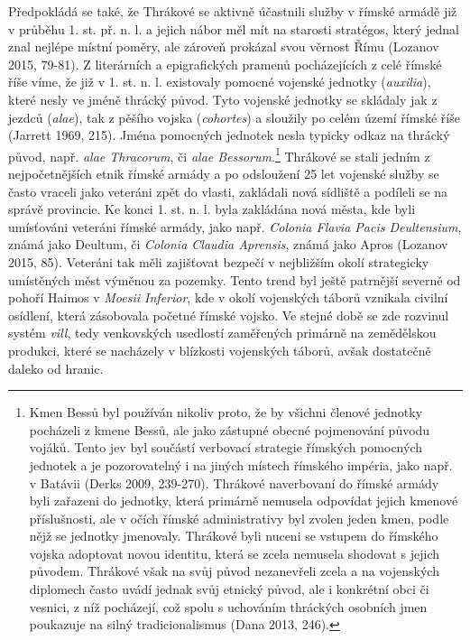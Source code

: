 Předpokládá se také, že Thrákové se aktivně účastnili služby v římské armádě již v průběhu 1. st. př. n. l. a jejich nábor měl mít na starosti stratégos, který jednal znal nejlépe místní poměry, ale zároveň prokázal svou věrnost Římu (Lozanov 2015, 79-81). Z literárních a epigrafických pramenů pocházejících z celé římské říše víme, že již v 1. st. n. l. existovaly pomocné vojenské jednotky ({\em auxilia}), které nesly ve jméně thrácký původ. Tyto vojenské jednotky se skládaly jak z jezdců ({\em alae}), tak z pěšího vojska ({\em cohortes}) a sloužily po celém území římské říše (Jarrett 1969, 215). Jména pomocných jednotek nesla typicky odkaz na thrácký původ, např. {\em alae Thracorum}, či {\em alae Bessorum}.\footnote{Kmen Bessů byl používán nikoliv proto, že by všichni členové jednotky pocházeli z kmene Bessů, ale jako zástupné obecné pojmenování původu vojáků. Tento jev byl součástí verbovací strategie římských pomocných jednotek a je pozorovatelný i na jiných místech římského impéria, jako např. v Batávii (Derks 2009, 239-270). Thrákové naverbovaní do římské armády byli zařazeni do jednotky, která primárně nemusela odpovídat jejich kmenové příslušnosti, ale v očích římské administrativy byl zvolen jeden kmen, podle nějž se jednotky jmenovaly. Thrákové byli nuceni se vstupem do římského vojska adoptovat novou identitu, která se zcela nemusela shodovat s jejich původem. Thrákové však na svůj původ nezanevřeli zcela a na vojenských diplomech často uvádí jednak svůj etnický původ, ale i konkrétní obci či vesnici, z níž pocházejí, což spolu s uchováním thráckých osobních jmen poukazuje na silný tradicionalismus (Dana 2013, 246).} Thrákové se stali jedním z nejpočetnějších etnik římské armády a po odsloužení 25 let vojenské služby se často vraceli jako veteráni zpět do vlasti, zakládali nová sídliště a podíleli se na správě provincie. Ke konci 1. st. n. l. byla zakládána nová města, kde byli umísťováni veteráni římské armády, jako např. {\em Colonia Flavia Pacis Deultensium}, známá jako Deultum, či {\em Colonia Claudia Aprensis}, známá jako Apros (Lozanov 2015, 85). Veteráni tak měli zajišťovat bezpečí v nejbližším okolí strategicky umístěných měst výměnou za pozemky. Tento trend byl ještě patrnější severně od pohoří Haimos v {\em Moesii Inferior}, kde v okolí vojenských táborů vznikala civilní osídlení, která zásobovala početné římské vojsko. Ve stejné době se zde rozvinul systém {\em vill}, tedy venkovských usedlostí zaměřených primárně na zemědělskou produkci, které se nacházely v blízkosti vojenských táborů, avšak dostatečně daleko od hranic.

